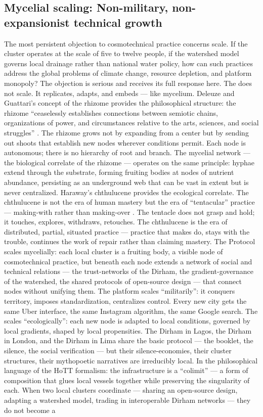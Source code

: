 \subsection{Mycelial scaling: Non-military, non-expansionist technical growth}

The most persistent objection to cosmotechnical practice concerns scale. If the  cluster operates at the scale of five to twelve people, if the watershed model governs local drainage rather than national water policy, how can such practices address the global problems of climate change, resource depletion, and platform monopoly? The objection is serious and receives its full response here. The  does not scale. It replicates, adapts, and embeds — like mycelium. Deleuze and Guattari’s concept of the rhizome provides the philosophical structure: the rhizome “ceaselessly establishes connections between semiotic chains, organizations of power, and circumstances relative to the arts, sciences, and social struggles” \cite[p.~7]{deleuze_guattari_1987}. The rhizome grows not by expanding from a center but by sending out shoots that establish new nodes wherever conditions permit. Each node is autonomous; there is no hierarchy of root and branch. The mycelial network — the biological correlate of the rhizome — operates on the same principle: hyphae extend through the substrate, forming fruiting bodies at nodes of nutrient abundance, persisting as an underground web that can be vast in extent but is never centralized. Haraway’s chthulucene provides the ecological correlate. The chthulucene is not the era of human mastery but the era of “tentacular” practice — making-with rather than making-over \cite{haraway_2016}. The tentacle does not grasp and hold; it touches, explores, withdraws, retouches. The chthulucene is the era of distributed, partial, situated practice — practice that makes do, stays with the trouble, continues the work of repair rather than claiming mastery. The  Protocol scales mycelially: each local cluster is a fruiting body, a visible node of cosmotechnical practice, but beneath each node extends a network of social and technical relations — the trust-networks of the Dirham, the gradient-governance of the watershed, the shared protocols of open-source design — that connect nodes without unifying them. The platform scales “militarily”: it conquers territory, imposes standardization, centralizes control. Every new city gets the same Uber interface, the same Instagram algorithm, the same Google search. The  scales “ecologically”: each new node is adapted to local conditions, governed by local gradients, shaped by local propensities. The Dirham in Lagos, the Dirham in London, and the Dirham in Lima share the basic protocol — the booklet, the silence, the social verification — but their silence-economies, their cluster structures, their mythopoetic narratives are irreducibly local. In the philosophical language of the HoTT formalism: the  infrastructure is a “colimit” — a form of composition that glues local vessels together while preserving the singularity of each. When two local  clusters coordinate — sharing an open-source design, adapting a watershed model, trading in interoperable Dirham networks — they do not become a 